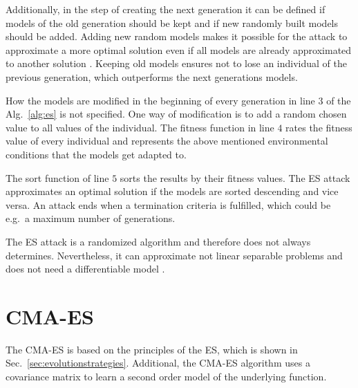 Additionally, in the step of creating the next generation it can be defined if models of the old generation should be kept and if new randomly built models should be added. %
Adding new random models makes it possible for the attack to approximate a more optimal solution even if all models are already approximated to another solution \cite{Rechenberg1994EvolutionsstrategiePrinzipien}.
Keeping old models ensures not to lose an individual of the previous generation, which outperforms the next generations models.

How the models are modified in the beginning of every generation in line $3$ of the Alg.\ \ref{alg:es} is not specified.
One way of modification is to add a random chosen value to all values of the individual. %
The fitness function in line $4$ rates the fitness value of every individual and represents the above mentioned environmental conditions that the models get adapted to. %

The sort function of line $5$ sorts the results by their fitness values.
The \ac{ES} attack approximates an optimal solution if the models are sorted descending and vice versa. %
An attack ends when a termination criteria is fulfilled, which could be e.g.\ a maximum number of generations.

The \ac{ES} attack is a randomized algorithm and therefore does not always determines.
Nevertheless, it can approximate not linear separable problems and does not need a differentiable model \cite{Ruhrmair2010ModelingFunctions}.
	

\section{CMA-ES}
\label{sec:cma-es}

The \acf{CMA-ES} is based on the principles of the \ac{ES}, which is shown in Sec.\ \ref{sec:evolutionstrategies}.
Additional, the \ac{CMA-ES} algorithm uses a covariance matrix to learn a second order model of the underlying function.

